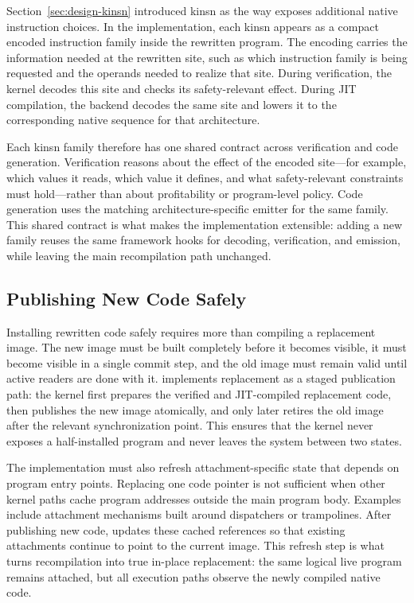 Section~\ref{sec:design-kinsn} introduced kinsn as the way \tool exposes additional native instruction choices. In the implementation, each kinsn appears as a compact encoded instruction family inside the rewritten program. The encoding carries the information needed at the rewritten site, such as which instruction family is being requested and the operands needed to realize that site. During verification, the kernel decodes this site and checks its safety-relevant effect. During JIT compilation, the backend decodes the same site and lowers it to the corresponding native sequence for that architecture.

Each kinsn family therefore has one shared contract across verification and code generation. Verification reasons about the effect of the encoded site---for example, which values it reads, which value it defines, and what safety-relevant constraints must hold---rather than about profitability or program-level policy. Code generation uses the matching architecture-specific emitter for the same family. This shared contract is what makes the implementation extensible: adding a new family reuses the same framework hooks for decoding, verification, and emission, while leaving the main recompilation path unchanged.

\subsection{Publishing New Code Safely}
\label{sec:impl-publish}

Installing rewritten code safely requires more than compiling a replacement image. The new image must be built completely before it becomes visible, it must become visible in a single commit step, and the old image must remain valid until active readers are done with it. \tool implements replacement as a staged publication path: the kernel first prepares the verified and JIT-compiled replacement code, then publishes the new image atomically, and only later retires the old image after the relevant synchronization point. This ensures that the kernel never exposes a half-installed program and never leaves the system between two states.

The implementation must also refresh attachment-specific state that depends on program entry points. Replacing one code pointer is not sufficient when other kernel paths cache program addresses outside the main program body. Examples include attachment mechanisms built around dispatchers or trampolines. After publishing new code, \tool updates these cached references so that existing attachments continue to point to the current image. This refresh step is what turns recompilation into true in-place replacement: the same logical live program remains attached, but all execution paths observe the newly compiled native code.

